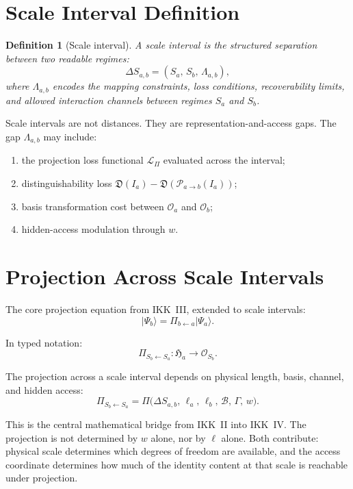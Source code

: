 \documentclass[11pt,a4paper,oneside]{article}
\newtheorem{definition}{Definition}[section]
\newcommand{\Ia}{I_a}                               %
\newcommand{\Ha}{\mathfrak{H}_a}               %
\newcommand{\OspS}[1]{\mathcal{O}_{S_{#1}}}  %
\newcommand{\DSab}{\Delta S_{a,b}}             %
\newcommand{\wcoord}{w}
\newcommand{\Pab}{\mathcal{P}_{a\to b}}        %
\newcommand{\PiS}[2]{\Pi_{S_{#2}\leftarrow S_{#1}}}  %
\newcommand{\D}{\mathfrak{D}}                  %
\newcommand{\Loss}{\mathcal{L}_\Pi}
\begin{document}
\section{Scale Interval Definition}
\label{def:interval}

\begin{definition}[Scale interval]
A scale interval is the structured separation between two readable regimes:
\[
\DSab = (S_a,\, S_b,\, \Lambda_{a,b}),
\]
where $\Lambda_{a,b}$ encodes the mapping constraints, loss conditions, recoverability limits, and allowed interaction channels between regimes $S_a$ and $S_b$.
\end{definition}

Scale intervals are not distances. They are representation-and-access gaps. The gap $\Lambda_{a,b}$ may include:
\begin{enumerate}
\item the projection loss functional $\Loss$ evaluated across the interval;
\item distinguishability loss $\D(\Ia) - \D(\Pab(\Ia))$;
\item basis transformation cost between $\mathcal{O}_a$ and $\mathcal{O}_b$;
\item hidden-access modulation through $\wcoord$.
\end{enumerate}

\section{Projection Across Scale Intervals}

The core projection equation from IKK~III, extended to scale intervals:
\[
|\Psi_b\rangle = \Pi_{b\leftarrow a}|\Psi_a\rangle.
\]

In typed notation:
\[
\PiS{a}{b} : \Ha \longrightarrow \OspS{b}.
\]

The projection across a scale interval depends on physical length, basis, channel, and hidden access:
\[
\PiS{a}{b} = \Pi\!\big(\DSab,\, \ell_a,\, \ell_b,\, \mathcal{B},\, \Gamma,\, \wcoord\big).
\]

This is the central mathematical bridge from IKK~II into IKK~IV. The projection is not determined by $\wcoord$ alone, nor by $\ell$ alone. Both contribute: physical scale determines which degrees of freedom are available, and the access coordinate determines how much of the identity content at that scale is reachable under projection.
\end{document}
